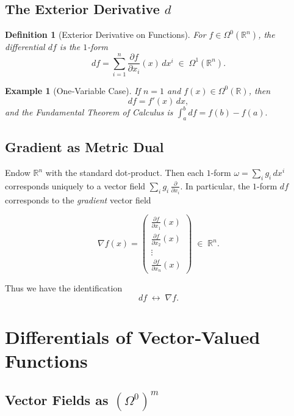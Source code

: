 \documentclass[12pt]{article}
\theoremstyle{definitionstyle}
\newtheorem{definition}{Definition} %
\newtheorem{example}{Example} %
\newcommand{\R}{\mathbb{R}}
\begin{document}
	\subsection{The Exterior Derivative \(d\)}
	
	\begin{definition}[Exterior Derivative on Functions]
		For \(f\in\Omega^0(\R^n)\), the differential \(df\) is the \(1\)-form
		\[
		df
		=\sum_{i=1}^n \frac{\partial f}{\partial x_i}(x)\,dx^i
		\;\in\;\Omega^1(\R^n).
		\]
	\end{definition}
	
	\begin{example}[One‐Variable Case]
		If \(n=1\) and \(f(x)\in\Omega^0(\R)\), then
		\[
		df = f'(x)\,dx,
		\]
		and the \emph{Fundamental Theorem of Calculus} is
		\(\int_a^b df = f(b)-f(a).\)
	\end{example}
	
	\subsection{Gradient as Metric Dual}
	
	Endow \(\R^n\) with the standard dot‐product.  Then each \(1\)-form
	\(\omega = \sum_i g_i\,dx^i\)
	corresponds uniquely to a vector field
	\(\displaystyle \sum_i g_i\,\frac{\partial}{\partial x_i}\).
	In particular, the \(1\)-form \(df\) corresponds to the \emph{gradient} vector field
	
	\[
	\nabla f(x)
	=\begin{pmatrix}
		\displaystyle \frac{\partial f}{\partial x_1}(x)\\[6pt]
		\displaystyle \frac{\partial f}{\partial x_2}(x)\\[4pt]
		\vdots\\[4pt]
		\displaystyle \frac{\partial f}{\partial x_n}(x)
	\end{pmatrix}
	\;\in\;\R^n.
	\]
	
	Thus we have the identification
	\[
	df 
	\;\longleftrightarrow\;
	\nabla f.
	\]
	
	\bigskip
	
	\section{Differentials of Vector‐Valued Functions}
	
	\subsection{Vector Fields as \((\Omega^0)^m\)}
	
\end{document}
